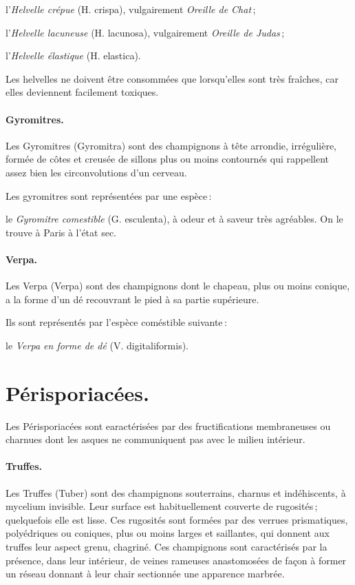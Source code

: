 l'\textit{Helvelle crépue} (H. crispa), vulgairement \textit{Oreille de Chat} ;

l'\textit{Helvelle lacuneuse} (H. lacunosa), vulgairement \textit{Oreille de
Judas} ;

l'\textit{Helvelle élastique} (H. elastica).

Les helvelles ne doivent être consommées que lorsqu'elles sont très fraîches,
car elles deviennent facilement toxiques.

\paragraph{Gyromitres.}

Les Gyromitres (Gyromitra) sont des champignons à tête arrondie, irrégulière,
formée de côtes et creusée de sillons plus ou moins contournés qui rappellent
assez bien les circonvolutions d'un cerveau.

Les gyromitres sont représentées par une espèce :

le \textit{Gyromitre comestible} (G. esculenta), à odeur et à saveur très
agréables. On le trouve à Paris à l'état sec.

\paragraph{Verpa.}

Les Verpa (Verpa) sont des champignons dont le chapeau, plus ou moins conique,
a la forme d'un dé recouvrant le pied à sa partie supérieure.

Ils sont représentés par l'espèce coméstible suivante :

le \textit{Verpa en forme de dé} (V. digitaliformis).

\section*{\centering Périsporiacées.}

Les Périsporiacées sont earactérisées par des fructifications membraneuses ou
charnues dont les asques ne communiquent pas avec le milieu intérieur.

\paragraph{Truffes.}

Les Truffes (Tuber) sont des champignons souterrains, charnus et indéhiscents,
à mycelium invisible. Leur surface est habituellement couverte de rugosités ;
quelquefois elle est lisse. Ces rugosités sont formées par des verrues
prismatiques, polyédriques ou coniques, plus ou moins larges et saillantes, qui
donnent aux truffes leur aspect grenu, chagriné. Ces champignons sont
caractérisés par la présence, dans leur intérieur, de veines rameuses
anastomosées de façon à former un réseau donnant à leur chair sectionnée une
apparence marbrée.


